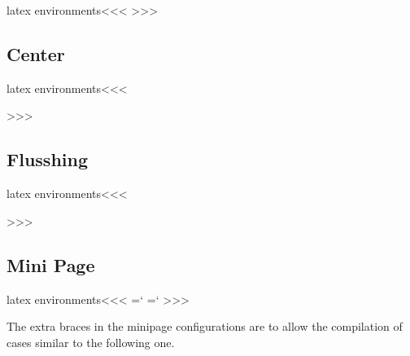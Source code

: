 \<latex environments\><<<
>>>

\subsection{Center}

\<latex environments\><<<
  {\EndP}{\par \ShowPar} {}{}
   {\IgnorePar\EndP{}\par\ShowPar}
   {\IgnorePar\EndP{}\par\ShowPar}
   {} {\par\ShowPar}
>>>

\subsection{Flusshing}

\<latex environments\><<<
  {\EndP}{\par \ShowPar} {}{}
  {\EndP}{\par \ShowPar} {}{}
  {\IgnorePar\EndP{}\par\ShowPar}
  {\IgnorePar\EndP{}\par\ShowPar}
  {} {\par\ShowPar}
  {\IgnorePar\EndP{}\par\ShowPar}
  {\IgnorePar\EndP{}\par\ShowPar}
  {} {\par\ShowPar}
>>>

\subsection{Mini Page}

\<latex environments\><<<
   {%
    {=`}\fi
   }
   {=`{\fi}%
   }
   {}{}
>>>

The extra braces in the minipage configurations are to allow the
compilation of cases similar to the following one.


